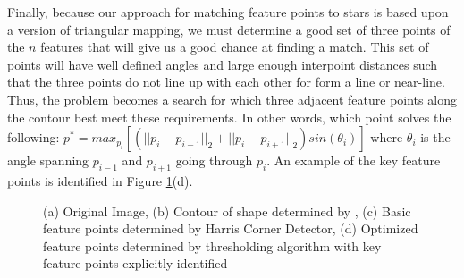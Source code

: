 \documentclass[paper=a4, fontsize=11pt]{scrartcl} %
\begin{document}
Finally, because our approach for matching feature points to stars is based upon a version of triangular mapping, we must determine a good set of three points of the $n$ features that will give us a good chance at finding a match. This set of points will have well defined angles and large enough interpoint distances such that the three points do not line up with each other for form a line or near-line. Thus, the problem becomes a search for which three adjacent feature points along the contour best meet these requirements. In other words, which point solves the following: $p^* = max_{p_i} [ (||p_i - p_{i-1}||_2 + ||p_i - p_{i+1}||_2) sin(\theta_i) ]$ where $\theta_i$ is the angle spanning $p_{i-1}$ and $p_{i+1}$ going through $p_i$. An example of the key feature points is identified in Figure \ref{feat_detect}(d). 

\pagebreak

\begin{figure}
\caption{(a) Original Image, (b) Contour of shape determined by \cite{Suzuki1985}, (c) Basic feature points determined by Harris Corner Detector, (d) Optimized feature points determined by thresholding algorithm with key feature points explicitly identified}
\label{feat_detect}
\end{figure}
\end{document}
